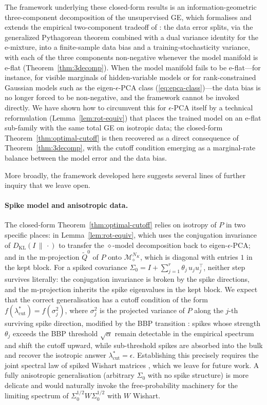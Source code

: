 \documentclass[11pt,a4paper]{article}
\theoremstyle{definition}
\theoremstyle{remark}
\newcommand{\KL}{D_{\mathrm{KL}}}
\newcommand{\PV}{P}
\newcommand{\NK}{N_K}
\newcommand{\Mfam}{\mathcal{M}}
\begin{document}
The framework underlying these closed-form results is an
information-geometric three-component decomposition of the
unsupervised GE, which formalises and extends the empirical
two-component tradeoff of \cite{Kim2023JSTAT}: the data error
splits, via the generalized Pythagorean theorem combined with a
dual variance identity for the e-mixture, into a finite-sample
data bias and a training-stochasticity variance, with each of
the three components non-negative whenever the model manifold
is e-flat (Theorem~\ref{thm:3decomp}). When the model manifold
fails to be e-flat---for instance, for visible marginals of
hidden-variable models or for rank-constrained Gaussian models
such as the eigen-$\epsilon$-PCA class
(\ref{eq:epca-class})---the data bias is no longer forced to be
non-negative, and the framework cannot be invoked directly. We
have shown how to circumvent this for $\epsilon$-PCA itself by a
technical reformulation (Lemma~\ref{lem:rot-equiv}) that places
the trained model on an e-flat sub-family with the same total
GE on isotropic data; the closed-form
Theorem~\ref{thm:optimal-cutoff} is then recovered as a direct
consequence of Theorem~\ref{thm:3decomp}, with the cutoff
condition emerging as a marginal-rate balance between the model
error and the data bias.

More broadly, the framework developed here suggests several
lines of further inquiry that we leave open.

\paragraph{Spike model and anisotropic data.}
The closed-form Theorem~\ref{thm:optimal-cutoff} relies on
isotropy of $\PV$ in two specific places: in
Lemma~\ref{lem:rot-equiv}, which uses the conjugation
invariance of $\KL(I \,\|\, \cdot)$ to transfer the
$\diamond$-model decomposition back to eigen-$\epsilon$-PCA;
and in the m-projection $\widetilde{Q}^{0}$ of $\PV$ onto
$\Mfam_{\diamond}^{\NK}$, which is diagonal with entries $1$ in
the kept block. For a spiked covariance
$\Sigma_{0} = I + \sum_{j=1}^{r} \theta_{j}\,u_{j}u_{j}^{\top}$,
neither step survives literally: the conjugation invariance is
broken by the spike directions, and the m-projection inherits
the spike eigenvalues in the kept block. We expect that the
correct generalisation has a cutoff condition of the form
$f(\lambda_{\mathrm{cut}}^{*}) = f(\sigma_{j}^{2})$, where
$\sigma_{j}^{2}$ is the projected variance of $\PV$ along the
$j$-th surviving spike direction, modified by the BBP transition
\cite{BaikBenArousPeche2005}: spikes whose strength
$\theta_{j}$ exceeds the BBP threshold $\sqrt{\alpha}$ remain
detectable in the empirical spectrum and shift the cutoff
upward, while sub-threshold spikes are absorbed into the bulk
and recover the isotropic answer
$\lambda_{\mathrm{cut}}^{*} = \epsilon$. Establishing this
precisely requires the joint spectral law of spiked Wishart
matrices \cite{BaikBenArousPeche2005,Johnstone2001}, which we
leave for future work. A fully anisotropic generalisation
(arbitrary $\Sigma_{0}$ with no spike structure) is more
delicate and would naturally invoke the free-probability
machinery for the limiting spectrum of
$\Sigma_{0}^{1/2} W \Sigma_{0}^{1/2}$ with $W$ Wishart.
\end{document}
